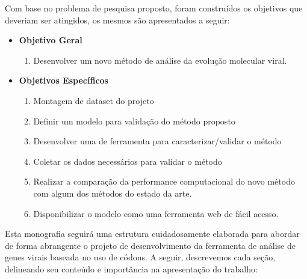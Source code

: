 Com base no problema de pesquisa proposto, foram construídos os objetivos que deveriam ser atingidos, os mesmos são apresentados a seguir:
\begin{itemize}
      \item \textbf{Objetivo Geral}
            \begin{enumerate}[label=~(\roman*)]
                  \item Desenvolver um novo método de análise da evolução molecular viral.
            \end{enumerate}
      \item \textbf{Objetivos Específicos}
            \begin{enumerate}[label=~(\roman*)]
                  \item Montagem de dataset do projeto
                  \item Definir um modelo para validação do método proposto
                  \item Desenvolver uma de ferramenta para caracterizar/validar o método
                  \item Coletar os dados necessários para validar o método
                  \item Realizar a comparação da performance computacional do novo método com algum dos métodos do estado da arte.
                  \item Disponibilizar o modelo como uma ferramenta web de fácil acesso.
            \end{enumerate}
\end{itemize}

Esta monografia seguirá uma estrutura cuidadosamente elaborada para abordar de forma abrangente o projeto de desenvolvimento da ferramenta de análise de genes virais baseada no uso de códons. A seguir, descrevemos cada seção, delineando seu conteúdo e importância na apresentação do trabalho:

